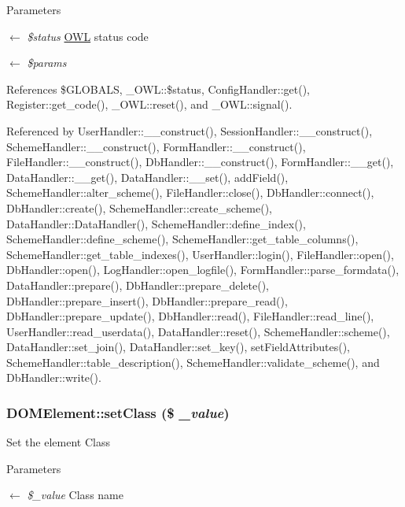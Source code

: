 \begin{DoxyParams}{Parameters}
\item[\mbox{$\leftarrow$} {\em \$status}]\hyperlink{classOWL}{OWL} status code \item[\mbox{$\leftarrow$} {\em \$params}]\end{DoxyParams}


References \$GLOBALS, \_\-OWL::\$status, ConfigHandler::get(), Register::get\_\-code(), \_\-OWL::reset(), and \_\-OWL::signal().



Referenced by UserHandler::\_\-\_\-construct(), SessionHandler::\_\-\_\-construct(), SchemeHandler::\_\-\_\-construct(), FormHandler::\_\-\_\-construct(), FileHandler::\_\-\_\-construct(), DbHandler::\_\-\_\-construct(), FormHandler::\_\-\_\-get(), DataHandler::\_\-\_\-get(), DataHandler::\_\-\_\-set(), addField(), SchemeHandler::alter\_\-scheme(), FileHandler::close(), DbHandler::connect(), DbHandler::create(), SchemeHandler::create\_\-scheme(), DataHandler::DataHandler(), SchemeHandler::define\_\-index(), SchemeHandler::define\_\-scheme(), SchemeHandler::get\_\-table\_\-columns(), SchemeHandler::get\_\-table\_\-indexes(), UserHandler::login(), FileHandler::open(), DbHandler::open(), LogHandler::open\_\-logfile(), FormHandler::parse\_\-formdata(), DataHandler::prepare(), DbHandler::prepare\_\-delete(), DbHandler::prepare\_\-insert(), DbHandler::prepare\_\-read(), DbHandler::prepare\_\-update(), DbHandler::read(), FileHandler::read\_\-line(), UserHandler::read\_\-userdata(), DataHandler::reset(), SchemeHandler::scheme(), DataHandler::set\_\-join(), DataHandler::set\_\-key(), setFieldAttributes(), SchemeHandler::table\_\-description(), SchemeHandler::validate\_\-scheme(), and DbHandler::write().

\subsubsection[{setClass}]{\setlength{\rightskip}{0pt plus 5cm}DOMElement::setClass (\$ {\em \_\-value})}\label{classDOMElement_a593e89f31f6c1050d3948b29b00f387a}
Set the element Class 
\begin{DoxyParams}{Parameters}
\item[\mbox{$\leftarrow$} {\em \$\_\-value}]Class name \end{DoxyParams}
